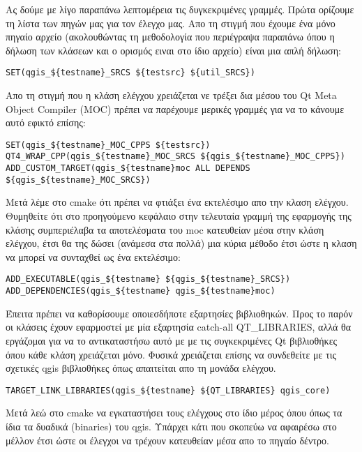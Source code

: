 Ας δούμε με λίγο παραπάνω λεπτομέρεια τις δυγκεκριμένες γραμμές. Πρώτα ορίζουμε τη λίστα των πηγών μας για τον έλεγχο μας. Απο τη στιγμή που έχουμε ένα μόνο πηγαίο αρχείο (ακολουθώντας τη μεθοδολογία που περιέγραψα παραπάνω όπου η δήλωση των κλάσεων και ο ορισμός ειναι στο ίδιο αρχείο) είναι μια απλή δήλωση:

\begin{verbatim}
SET(qgis_${testname}_SRCS ${testsrc} ${util_SRCS})
\end{verbatim}

Απο τη στιγμή που η κλάση ελέγχου χρειάζεται νε τρέξει δια μέσου του Qt Meta Object Compiler (MOC) πρέπει να παρέχουμε μερικές γραμμές για να το κάνουμε αυτό εφικτό επίσης:

\begin{verbatim}
SET(qgis_${testname}_MOC_CPPS ${testsrc})
QT4_WRAP_CPP(qgis_${testname}_MOC_SRCS ${qgis_${testname}_MOC_CPPS})
ADD_CUSTOM_TARGET(qgis_${testname}moc ALL DEPENDS ${qgis_${testname}_MOC_SRCS})
\end{verbatim}

Μετά λέμε στο cmake ότι πρέπει να φτιάξει ένα εκτελέσιμο απο την κλαση ελέγχου. Θυμηθείτε ότι στο προηγούμενο κεφάλαιο στην τελευταία γραμμή της εφαρμογής της κλάσης συμπεριέλαβα τα αποτελέσματα του moc κατευθείαν μέσα στην κλάση ελέγχου, έτσι θα της δώσει (ανάμεσα στα πολλά) μια κύρια μέθοδο έτσι ώστε η κλαση να μπορεί να συνταχθεί ως ένα εκτελέσιμο:

\begin{verbatim}
ADD_EXECUTABLE(qgis_${testname} ${qgis_${testname}_SRCS})
ADD_DEPENDENCIES(qgis_${testname} qgis_${testname}moc)
\end{verbatim}

Έπειτα πρέπει να καθορίσουμε οποιεσδήποτε εξαρτησίες βιβλιοθηκών. Προς το παρόν οι κλάσεις έχουν εφαρμοστεί με μία εξαρτησία catch-all QT\_LIBRARIES, αλλά θα εργάζομαι για να το αντικαταστήσω αυτό με με τις συγκεκριμένες Qt βιβλιοθήκες όπου κάθε κλάση χρειάζεται μόνο. Φυσικά χρειάζεται επίσης να συνδεθείτε με τις σχετικές qgis βιβλιοθήκες όπως απαιτείται απο τη μονάδα ελέγχου.

\begin{verbatim}
TARGET_LINK_LIBRARIES(qgis_${testname} ${QT_LIBRARIES} qgis_core)
\end{verbatim}

Μετά λεώ στο cmake να εγκαταστήσει τους ελέγχους στο ίδιο μέρος όπου όπως τα ίδια τα δυαδικά (binaries) του qgis. Υπάρχει κάτι που σκοπεύω να αφαιρέσω στο μέλλον έτσι ώστε οι έλεγχοι να τρέχουν κατευθείαν μέσα απο το πηγαίο δέντρο.

